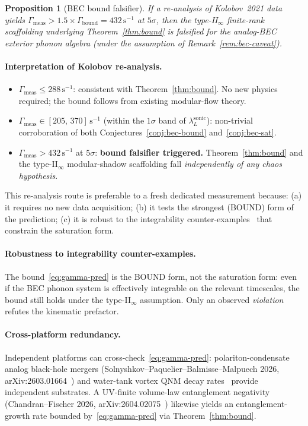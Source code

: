 \documentclass[12pt,a4paper]{article}
\newtheorem{proposition}[theorem]{Proposition}
\begin{document}
\begin{proposition}[BEC bound falsifier]
\label{prop:bec-falsifier}
If a re-analysis of Kolobov~2021 data yields
$\Gamma_{\mathrm{meas}} > 1.5 \times \Gamma_{\mathrm{bound}}
= 432\,\mathrm{s}^{-1}$ at $5\sigma$, then the type-II$_\infty$
finite-rank scaffolding underlying Theorem~\ref{thm:bound} is
falsified for the analog-BEC exterior phonon algebra
(under the assumption of Remark~\ref{rem:bec-caveat}).
\end{proposition}

\paragraph{Interpretation of Kolobov re-analysis.}
\begin{itemize}
\item $\Gamma_{\mathrm{meas}} \le 288\,\mathrm{s}^{-1}$:
  consistent with Theorem~\ref{thm:bound}.
  No new physics required; the bound follows from existing
  modular-flow theory.
\item $\Gamma_{\mathrm{meas}} \in [205,\,370]\,\mathrm{s}^{-1}$
  (within the $1\sigma$ band of $\lambda_L^{\mathrm{sonic}}$):
  non-trivial corroboration of both Conjectures~\ref{conj:bec-bound}
  and~\ref{conj:bec-sat}.
\item $\Gamma_{\mathrm{meas}} > 432\,\mathrm{s}^{-1}$ at $5\sigma$:
  \textbf{bound falsifier triggered.}
  Theorem~\ref{thm:bound} and the type-II$_\infty$ modular-shadow
  scaffolding fall \emph{independently of any chaos hypothesis}.
\end{itemize}
This re-analysis route is preferable to a fresh dedicated measurement
because: (a) it requires no new data acquisition; (b) it tests the
strongest (BOUND) form of the prediction; (c) it is robust to the
integrability counter-examples~\cite{AvdoshkinDymarsky2019,Camargo2023,Sreeram2025}
that constrain the saturation form.

\paragraph{Robustness to integrability counter-examples.}
The bound~\eqref{eq:gamma-pred} is the BOUND form, not the saturation
form: even if the BEC phonon system is effectively integrable on the
relevant timescales, the bound still holds under the type-II$_\infty$
assumption.  Only an observed \emph{violation} refutes the
kinematic prefactor.

\paragraph{Cross-platform redundancy.}
Independent platforms can cross-check~\eqref{eq:gamma-pred}:
polariton-condensate analog black-hole mergers
(Solnyshkov--Paquelier--Balmisse--Malpuech 2026,
arXiv:2603.01664~\cite{Solnyshkov2026}) and water-tank vortex QNM
decay rates~\cite{TorresPatrick2017} provide independent substrates.
A UV-finite volume-law entanglement negativity
(Chandran--Fischer 2026, arXiv:2604.02075~\cite{ChandranFischer2026})
likewise yields an entanglement-growth rate bounded
by~\eqref{eq:gamma-pred} via Theorem~\ref{thm:bound}.
\end{document}
